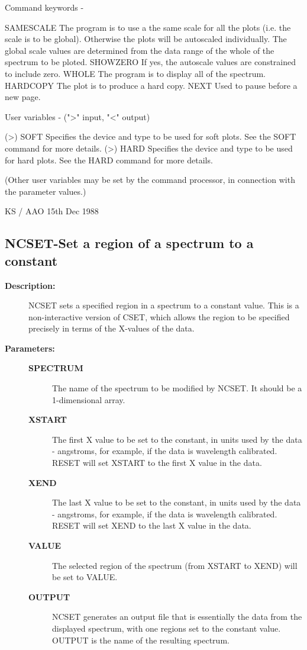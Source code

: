 \begin{description}
\begin{description}
\begin{terminalv}
 Command keywords -

 SAMESCALE   The program is to use a the same scale for all the
             plots (i.e. the scale is to be global).  Otherwise the
             plots will be autoscaled individually.  The global
             scale values are determined from the data range of
             the whole of the spectrum to be ploted.
 SHOWZERO    If yes, the autoscale values are constrained to
             include zero.
 WHOLE       The program is to display all of the spectrum.
 HARDCOPY    The plot is to produce a hard copy.
 NEXT        Used to pause before a new page.

 User variables -    (">" input, "<" output)

 (>) SOFT    Specifies the device and type to be used for soft
             plots.  See the SOFT command for more details.
 (>) HARD    Specifies the device and type to be used for hard
             plots.  See the HARD command for more details.

 (Other user variables may be set by the command processor, in
 connection with the parameter values.)

                                     KS / AAO 15th Dec 1988
\end{terminalv}
\end{description}
\subsection{NCSET-\label{NCSET}Set a region of a spectrum to a constant}
\begin{description}

\item [\textbf{Description:}]
 NCSET sets a specified region in a spectrum to a constant value.
 This is a non-interactive version of CSET, which allows the region
 to be specified precisely in terms of the X-values of the data.

\item [\textbf{Parameters:}]
\begin{description}
\item [\textbf{SPECTRUM}]
 The name of the spectrum to be modified by NCSET.
 It should be a 1-dimensional array.
\item [\textbf{XSTART}]
 The first X value to be set to the constant,
 in units used by the data - angstroms, for example, if the
 data is wavelength calibrated.  RESET will set XSTART to the
 first X value in the data.
\item [\textbf{XEND}]
 The last X value to be set to the constant,
 in units used by the data - angstroms, for example, if the
 data is wavelength calibrated.  RESET will set XEND to the
 last X value in the data.
\item [\textbf{VALUE}]
 The selected region of the spectrum (from XSTART to
 XEND) will be set to VALUE.
\item [\textbf{OUTPUT}]
 NCSET generates an output file that is essentially the
 data from the displayed spectrum, with one regions
 set to the constant value.  OUTPUT is the name of the
 resulting spectrum.
\end{description}


\end{description}
\end{description}

